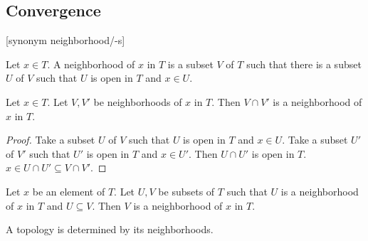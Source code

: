 \documentclass[english,11pt]{article}
\begin{document}
\subsection{Convergence}

\begin{forthel}

[synonym neighborhood/-s]

\begin{definition} Let $x \in T$. A neighborhood of $x$ in $T$
is a subset $V$ of $T$ such that there is a subset $U$ of $V$  
such that $U$ is open in $T$ and $x \in U$.
\end{definition}

\begin{lemma} Let $x \in T$. Let $V,V'$ be neighborhoods of $x$ in $T$.
Then $V \cap V'$ is a neighborhood of $x$ in $T$.
\end{lemma}
\begin{proof} Take a subset $U$ of $V$ such that $U$ is open
in $T$ and $x \in U$.
Take a subset $U'$ of $V'$ such that $U'$ is open
in $T$ and $x \in U'$.
Then $U \cap U'$ is open in $T$.
$x \in U \cap U' \subseteq V \cap V'$.
\end{proof}

\begin{lemma}
Let $x$ be an element of $T$. Let $U,V$ be subsets of $T$
such that $U$ is a neighborhood of
$x$ in $T$ and $U \subseteq V$.
Then $V$ is a neighborhood of $x$ in $T$.
\end{lemma}

\end{forthel}
A topology is determined by its neighborhoods.
\end{document}
